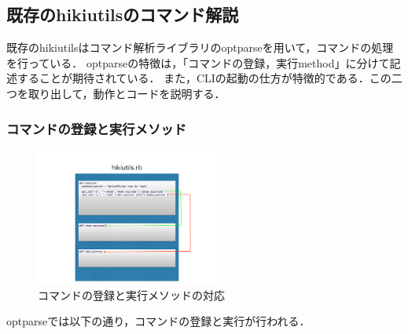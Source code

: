 
\subsection{既存のhikiutilsのコマンド解説}
既存のhikiutilsはコマンド解析ライブラリのoptparseを用いて，コマンドの処理を行っている．
optparseの特徴は，「コマンドの登録，実行method」に分けて記述することが期待されている．
また，CLIの起動の仕方が特徴的である．この二つを取り出して，動作とコードを説明する．

\subsubsection{コマンドの登録と実行メソッド}
\begin{figure}[htbp]\begin{center}
\includegraphics[width=6cm,bb=0 0 442 432]{../figs/./hikiutils_yamane.005.jpg}
\caption{コマンドの登録と実行メソッドの対応}
\label{default}\end{center}\end{figure}
optparseでは以下の通り，コマンドの登録と実行が行われる．

